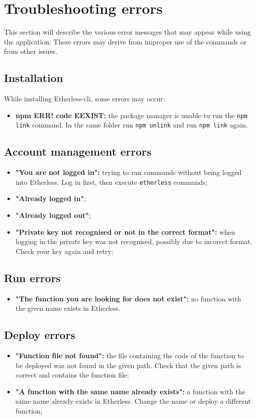 \section{Troubleshooting errors}
  This section will describe the various error messages that may appear while using the application. These errors may derive from improper use of the commands or from other issues.
  \subsection{Installation}
    While installing Etherless-cli, some errors may occur:
    \begin{itemize}
      \item \textbf{npm ERR! code EEXIST:} the package manager is unable tu run the \texttt{npm link} command. In the same folder run \texttt{npm unlink} and run \texttt{npm link} again.
    \end{itemize}
  \subsection{Account management errors}
    \begin{itemize}
      \item \textbf{"You are not logged in":} trying to run commands without being logged into Etherless. Log in first, then execute \texttt{etherless} commands;
      \item \textbf{"Already logged in"};
      \item \textbf{"Already logged out"};
      \item \textbf{"Private key not recognised or not in the correct format":} when logging in the private key was not recognised, possibly due to incorect format. Check your key again and retry;
    \end{itemize}
  \subsection{Run errors}
  \begin{itemize}
    \item \textbf{"The function you are looking for does not exist":} no function with the given name exists in Etherless.
  \end{itemize}
  \subsection{Deploy errors}
  \begin{itemize}
    \item \textbf{"Function file not found":} the file containing the code of the function to be deployed was not found in the given path. Check that the given path is correct and contains the function file;
    \item \textbf{"A function with the same name already exists":} a function with the same name already exists in Etherless. Change the name or deploy a different function;
  \end{itemize}
